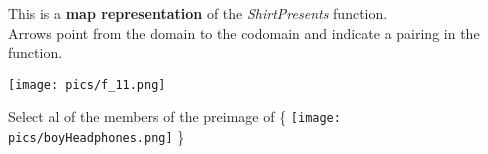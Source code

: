\documentclass{ximera}
\author{Lee Wayand}
\begin{document}
\begin{exercise}





This is a \textbf{map representation} of the \textit{ShirtPresents} function. \\

Arrows point from the domain to the codomain and indicate a pairing in the function.

\begin{image}
\texttt{[image: pics/f\_11.png]}
\end{image}










Select al of the members of the preimage of \huge\{ \texttt{[image: pics/boyHeadphones.png]} \huge\}



\begin{selectAll}
\end{selectAll}














\end{exercise}
\end{document}
